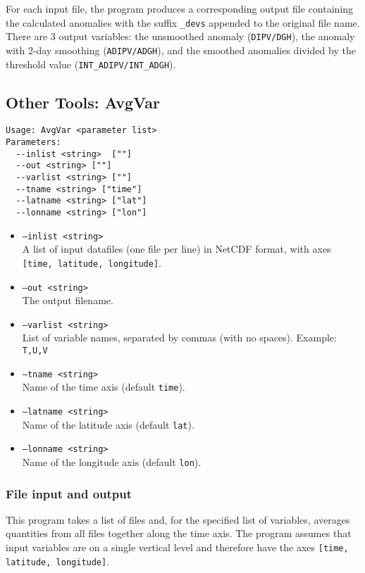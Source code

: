 \documentclass{article}
\begin{document}
For each input file, the program produces a corresponding output file containing the calculated anomalies with the suffix \texttt{\_devs} appended to the original file name. There are 3 output variables: the unsmoothed anomaly (\texttt{DIPV/DGH}), the anomaly with 2-day smoothing (\texttt{ADIPV/ADGH}), and 
the smoothed anomalies divided by the threshold value (\texttt{INT\_ADIPV/INT\_ADGH}).


\subsection{Other Tools: AvgVar}
\begin{verbatim}
Usage: AvgVar <parameter list>
Parameters:
  --inlist <string>  [""]
  --out <string> [""]
  --varlist <string> [""]
  --tname <string> ["time"]
  --latname <string> ["lat"]
  --lonname <string> ["lon"]
\end{verbatim}

\begin{itemize}
\item[]\texttt{--inlist <string>} \\ A list of input datafiles (one file per line) in NetCDF format, with axes \texttt{[time, latitude, longitude]}. 
\item[] \texttt{--out <string>}\\ The output filename.
\item[] \texttt{--varlist <string>}\\ List of variable names, separated by commas (with no spaces). Example: \texttt{T,U,V}
\item[] \texttt{--tname <string>}\\Name of the time axis (default \texttt{time}).
\item[]\texttt{--latname <string>}\\Name of the latitude axis (default \texttt{lat}).
\item[]\texttt{--lonname <string>}\\Name of the longitude axis (default \texttt{lon}).
\end{itemize}

\subsubsection{File input and output}
This program takes a list of files and, for the specified list of variables, averages quantities from all files together along the time axis. The program assumes that input variables are on a single vertical level and therefore have the axes \texttt{[time, latitude, longitude]}. 
\end{document}
